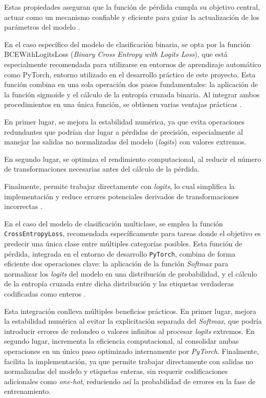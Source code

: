 Estas propiedades aseguran que la función de pérdida cumpla su objetivo central, actuar como un mecanismo confiable y eficiente para guiar la actualización de los parámetros del modelo \cite{ultralytics_loss_function}.

En el caso específico del modelo de clasificación binaria, se opta por la función BCEWithLogitsLoss (\textit{Binary Cross Entropy with Logits Loss}), que está especialmente recomendada para utilizarse en entornos de aprendizaje automático como PyTorch, entorno utilizado en el desarrollo práctico de este proyecto. Esta función combina en una sola operación dos pasos fundamentales: la aplicación de la función sigmoide y el cálculo de la entropía cruzada binaria. Al integrar ambos procedimientos en una única función, se obtienen varias ventajas prácticas \cite{datacamp_loss_function}.

En primer lugar, se mejora la estabilidad numérica, ya que evita operaciones redundantes que podrían dar lugar a pérdidas de precisión, especialmente al manejar las salidas no normalizadas del modelo (\textit{logits}) con valores extremos.

En segundo lugar, se optimiza el rendimiento computacional, al reducir el número de transformaciones necesarias antes del cálculo de la pérdida. 

Finalmente, permite trabajar directamente con \textit{logits}, lo cual simplifica la implementación y reduce errores potenciales derivados de transformaciones incorrectas \cite{bigdatafran_pytorch_classification}.


En el caso del modelo de clasificación multiclase, se emplea la función \texttt{CrossEntropyLoss}, recomendada específicamente para tareas donde el objetivo es predecir una única clase entre múltiples categorías posibles. Esta función de pérdida, integrada en el entorno de desarrollo \texttt{PyTorch}, combina de forma eficiente dos operaciones clave: la aplicación de la función \textit{Softmax} para normalizar los \textit{logits} del modelo en una distribución de probabilidad, y el cálculo de la entropía cruzada entre dicha distribución y las etiquetas verdaderas codificadas como enteros \cite{paszke2019pytorch}.

Esta integración conlleva múltiples beneficios prácticos. En primer lugar, mejora la estabilidad numérica al evitar la explicitación separada del \textit{Softmax}, que podría introducir errores de redondeo o valores infinitos al procesar \textit{logits} extremos. En segundo lugar, incrementa la eficiencia computacional, al consolidar ambas operaciones en un único paso optimizado internamente por \textit{PyTorch}. Finalmente, facilita la implementación, ya que permite trabajar directamente con salidas no normalizadas del modelo y etiquetas enteras, sin requerir codificaciones adicionales como \textit{one-hot}, reduciendo así la probabilidad de errores en la fase de entrenamiento.



